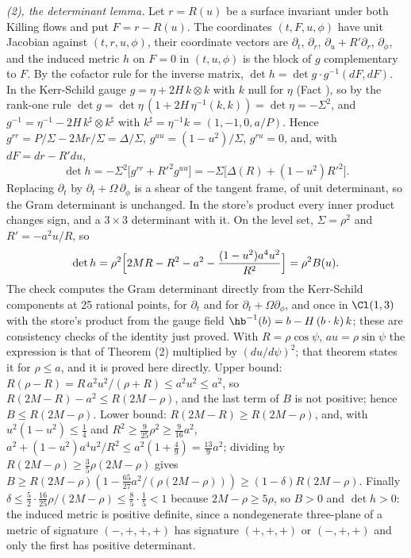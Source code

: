 \emph{(2), the determinant lemma.} Let $r = R(u)$ be a surface invariant under both Killing flows and put $F = r - R(u)$. The coordinates $(t, F, u, \phi)$ have unit Jacobian against $(t, r, u, \phi)$, their coordinate vectors are $\partial_{t}$, $\partial_{r}$, $\partial_{u} + R'\partial_{r}$, $\partial_{\phi}$, and the induced metric $h$ on $F = 0$ in $(t, u, \phi)$ is the block of $g$ complementary to $F$. By the cofactor rule for the inverse matrix, $\det h = \det g\cdot g^{-1}(dF, dF)$. In the Kerr-Schild gauge $g = \eta + 2H\,k\otimes k$ with $k$ null for $\eta$ (Fact ), so by the rank-one rule $\det g = \det\eta\,(1 + 2H\,\eta^{-1}(k, k)) = \det\eta = -\Sigma^{2}$, and $g^{-1} = \eta^{-1} - 2H\,k^{\sharp}\otimes k^{\sharp}$ with $k^{\sharp} = \eta^{-1}k = (1, -1, 0, a/P)$. Hence $g^{rr} = P/\Sigma - 2Mr/\Sigma = \Delta/\Sigma$, $g^{uu} = (1 - u^{2})/\Sigma$, $g^{ru} = 0$, and, with $dF = dr - R'du$,
\[
\det h = -\Sigma^{2}\bigl[g^{rr} + R'^{2}g^{uu}\bigr] = -\Sigma\bigl[\Delta(R) + (1 - u^{2})R'^{2}\bigr] .
\]
Replacing $\partial_{t}$ by $\partial_{t} + \Omega\,\partial_{\phi}$ is a shear of the tangent frame, of unit determinant, so the Gram determinant is unchanged. In the store's product every inner product changes sign, and a $3 \times 3$ determinant with it. On the level set, $\Sigma = \rho^{2}$ and $R' = -a^{2}u/R$, so
\[
\det h = \rho^{2}\Bigl[2MR - R^{2} - a^{2} - \frac{(1 - u^{2})a^{4}u^{2}}{R^{2}}\Bigr] = \rho^{2}B(u) .
\]
The check computes the Gram determinant directly from the Kerr-Schild components at 25 rational points, for $\partial_{t}$ and for $\partial_{t} + \Omega\partial_{\phi}$, and once in $\Cl(1,3)$ with the store's product from the gauge field $\hb^{-1}(b) = b - H\,(b\cdot k)\,k$; these are consistency checks of the identity just proved. With $R = \rho\cos\psi$, $au = \rho\sin\psi$ the expression is that of Theorem (2) multiplied by $(du/d\psi)^{2}$; that theorem states it for $\rho \le a$, and it is proved here directly. Upper bound: $R(\rho - R) = R\,a^{2}u^{2}/(\rho + R) \le a^{2}u^{2} \le a^{2}$, so $R(2M - R) - a^{2} \le R(2M - \rho)$, and the last term of $B$ is not positive; hence $B \le R(2M - \rho)$. Lower bound: $R(2M - R) \ge R(2M - \rho)$, and, with $u^{2}(1 - u^{2}) \le \tfrac14$ and $R^{2} \ge \tfrac{9}{25}\rho^{2} \ge \tfrac{9}{16}a^{2}$, $a^{2} + (1 - u^{2})a^{4}u^{2}/R^{2} \le a^{2}(1 + \tfrac49) = \tfrac{13}{9}a^{2}$; dividing by $R(2M - \rho) \ge \tfrac35\rho(2M - \rho)$ gives $B \ge R(2M - \rho)(1 - \tfrac{65}{27}a^{2}/(\rho(2M - \rho))) \ge (1 - \delta)R(2M - \rho)$. Finally $\delta \le \tfrac52\cdot\tfrac{16}{25}\rho/(2M - \rho) \le \tfrac85\cdot\tfrac15 < 1$ because $2M - \rho \ge 5\rho$, so $B > 0$ and $\det h > 0$: the induced metric is positive definite, since a nondegenerate three-plane of a metric of signature $(-,+,+,+)$ has signature $(+,+,+)$ or $(-,+,+)$ and only the first has positive determinant.

